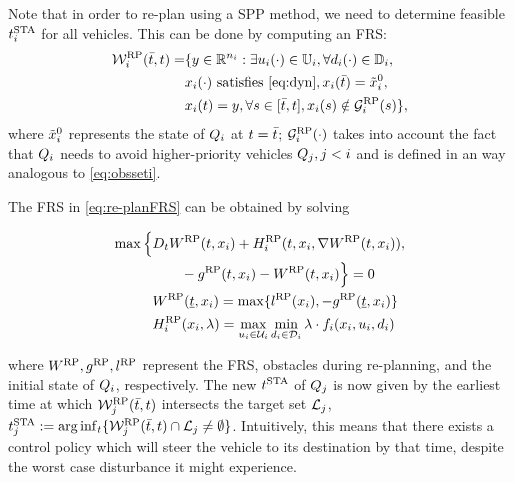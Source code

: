 Note that in order to re-plan using a SPP method, we need to determine feasible $t^\text{STA}_i$ for all vehicles. This can be done by computing an FRS:
\begin{equation} \label{eq:re-planFRS}
\begin{aligned} 
\frs_i^{\text{RP}}(\tea, t) = & \{y \in \R^{n_i}: \exists \ctrl_i(\cdot) \in \cfset_i, \forall \dstb_i(\cdot) \in \dfset_i, \\
& \state_i(\cdot) \text{ satisfies \eqref{eq:dyn}}, \state_i(\tea) = \tilde{\state}_i^0, \\
& \state_i(t) = y, \forall s \in [\tea, t], \state_i(s) \notin \obsset_i^{\text{RP}}(s) \},
\end{aligned}
\end{equation}
\noindent where $\tilde{x}_i^0$ represents the state of $Q_i$ at $t = \bar{t}$; $\mathcal{G}_i^{\text{RP}}(\cdot)$ takes into account the fact that $Q_i$ needs to avoid higher-priority vehicles $Q_j, j<i$ and is defined in an way analogous to \eqref{eq:obsseti}.

The FRS in \eqref{eq:re-planFRS} can be obtained by solving %

\begin{equation}
\begin{aligned}
\max \Big\{&D_t W^{\text{RP}}(t, x_i) + H_i^{\text{RP}}(t, x_i, \nabla W^{\text{RP}}(t, x_i)), \\
&\qquad - g^{\text{RP}}(t, x_i) - W^{\text{RP}}(t, x_i) \Big\} = 0\\
&W^{\text{RP}}(\underline{t}, x_i) = \max\{l^{\text{RP}}(x_i), -g^{\text{RP}}(\underline{t}, x_i)\} \\
&H_i^{\text{RP}}(x_i, \lambda) = \max_{u_i \in \mathcal{U}_i} \min_{d_i \in \mathcal{D}_i} \lambda \cdot f_i (x_i, u_i, d_i)
\end{aligned}
\end{equation} 

\noindent where $W^{\text{RP}}, g^{\text{RP}}, l^{\text{RP}}$ represent the FRS, obstacles during re-planning, and the initial state of $Q_i$, respectively. The new $t^\text{STA}$ of $Q_j$ is now given by the earliest time at which $\mathcal{W}_j^{\text{RP}}(\bar{t}, t)$ intersects the target set $\mathcal{L}_j$, $t^\text{STA}_j := \arg \inf_t \{ \mathcal{W}_j^{\text{RP}}(\bar{t}, t) \cap \mathcal{L}_j \neq \emptyset \}$. Intuitively, this means that there exists a control policy which will steer the vehicle to its destination by that time, despite the worst case disturbance it might experience.

